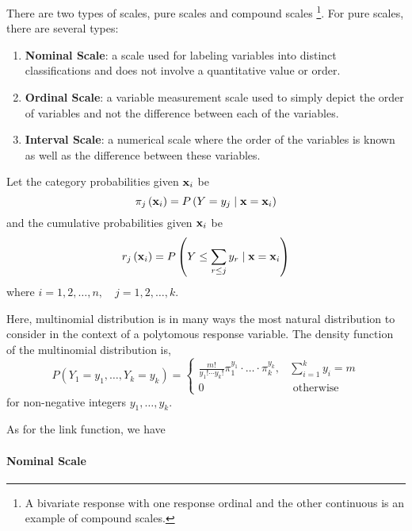 \begin{remark}
	There are two types of scales, pure scales and compound scales \footnote{A bivariate response with one response ordinal and the other continuous is an example of compound scales.}. For pure scales, there are several types:
	\begin{enumerate}
		\item \textbf{Nominal Scale}: a scale used for labeling variables into distinct classifications and does not involve a quantitative value or order.
		\item \textbf{Ordinal Scale}: a variable measurement scale used to simply depict the order of variables and not the difference between each of the variables.
		\item \textbf{Interval Scale}: a numerical scale where the order of the variables is known as well as the difference between these variables.
	\end{enumerate}
\end{remark}

Let the category probabilities given ${\bf x}_{i}$ be
\begin{equation}
	\pi_{j}\left({\bf x}_{i}\right)=P\left(Y=y_{j}\mid{\bf x}={\bf x}_{i}\right)
\end{equation}
and the cumulative probabilities given ${\bf x}_{i}$ be
\begin{equation}
	r_{j}\left({\bf x}_{i}\right)=P\left(Y\leq\sum_{r\leq j}y_{r}\mid{\bf x}={\bf x}_{i}\right)
\end{equation}
where $i=1,2,\ldots,n,\quad j=1,2,\ldots,k$.

Here, multinomial distribution is in many ways the most natural distribution to consider in the context of a polytomous response variable. The density function of the multinomial distribution is,
\begin{equation*}
	P\left(Y_{1}=y_{1},\ldots,Y_{k}=y_{k}\right)=
	\left\{\begin{array}{ll}
		\frac{m!}{y_{1}!\cdots y_{k}!}\pi_{1}^{y_{1}}\cdot\ldots\cdot \pi_{k}^{y_{k}}, & \sum_{i=1}^{k}y_{i}=m \\
		0                                                                              & \text { otherwise }
	\end{array}\right.
\end{equation*}
for non-negative integers $y_{1},\ldots,y_{k}$.

As for the link function, we have

\paragraph*{Nominal Scale}

